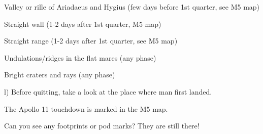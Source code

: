 \documentclass[12pt]{article}
\begin{document}
\smallskip
Valley or rille of Ariadaeus and Hygius (few days before 1st quarter, see M5
map) 

\smallskip
Straight wall (1-2 days after 1st quarter, M5 map)

\smallskip
Straight range (1-2 days after 1st quarter, see M5 map)

\smallskip
Undulations/ridges in the flat mares (any phase)

\smallskip
Bright craters and rays (any phase)

\medskip
l) Before quitting, take a look at the place where man first landed. 

The Apollo 11 touchdown is marked in the M5 map. 

Can you see any footprints or pod marks? They are still there!

\bigskip 
       
\end{document}
